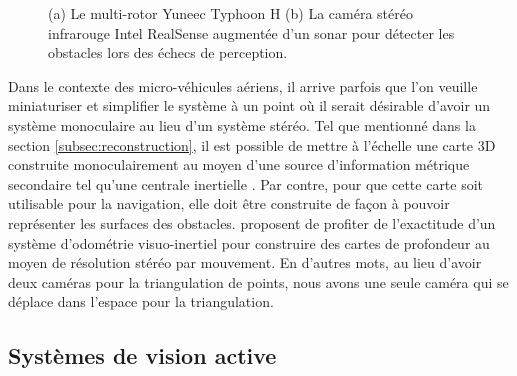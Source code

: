 \begin{figure}[ht]
  \centering
  \hfil
  \caption[Systèmes de caméra stéréo augmentés de capteurs secondaires.]{
    (a) Le multi-rotor Yuneec Typhoon H (b) La caméra stéréo infrarouge Intel RealSense augmentée d'un sonar pour détecter les obstacles lors des échecs de perception.
  }
  \label{fig:yuneec}
\end{figure}

Dans le contexte des micro-véhicules aériens, il arrive parfois que l'on veuille miniaturiser et simplifier le système à un point où il serait désirable d'avoir un système monoculaire au lieu d'un système stéréo. Tel que mentionné dans la section \ref{subsec:reconstruction}, il est possible de mettre à l'échelle une carte 3D construite monoculairement au moyen d'une source d'information métrique secondaire tel qu'une centrale inertielle \citep{muratal2017vimonoslam}. Par contre, pour que cette carte soit utilisable pour la navigation, elle doit être construite de façon à pouvoir représenter les surfaces des obstacles. \cite{Yang2017} proposent de profiter de l'exactitude d'un système d'odométrie visuo-inertiel pour construire des cartes de profondeur au moyen de résolution stéréo par mouvement. En d'autres mots, au lieu d'avoir deux caméras pour la triangulation de points, nous avons une seule caméra qui se déplace dans l'espace pour la triangulation.

\subsection{Systèmes de vision active}

